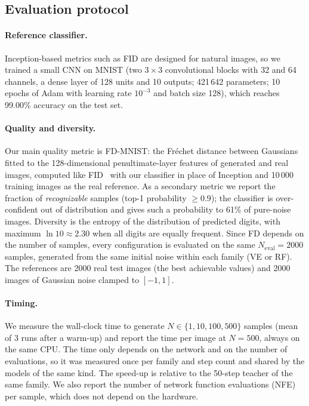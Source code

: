 \documentclass{article}
\begin{document}
\subsection{Evaluation protocol}
\label{sec:evaluation}

\paragraph{Reference classifier.} Inception-based metrics such as FID are
designed for natural images, so we trained a small CNN on MNIST (two
$3\times3$ convolutional blocks with 32 and 64 channels, a dense layer of 128
units and 10 outputs; 421\,642 parameters; 10 epochs of Adam with learning rate
$10^{-3}$ and batch size 128), which reaches 99.00\% accuracy on the test set.

\paragraph{Quality and diversity.} Our main quality metric is FD-MNIST: the
Fréchet distance between Gaussians fitted to the 128-dimensional
penultimate-layer features of generated and real images, computed like
FID~\cite{heusel2017fid} with our classifier in place of Inception and 10\,000
training images as the real reference. As a secondary metric we report the
fraction of \emph{recognizable} samples (top-1 probability $\geq 0.9$); the
classifier is over-confident out of distribution and gives such a probability
to 61\% of pure-noise images. Diversity is the entropy of the distribution of
predicted digits, with maximum $\ln 10 \approx 2.30$ when all digits are
equally frequent. Since FD depends on the number of samples, every
configuration is evaluated on the same $N_\text{eval} = 2000$ samples,
generated from the same initial noise within each family (VE or RF). The
references are 2000 real test images (the best achievable values) and 2000
images of Gaussian noise clamped to $[-1, 1]$.

\paragraph{Timing.} We measure the wall-clock time to generate
$N \in \{1, 10, 100, 500\}$ samples (mean of 3 runs after a warm-up) and
report the time per image at $N = 500$, always on the same CPU. The time only
depends on the network and on the number of evaluations, so it was measured once
per family and step count and shared by the models of the same kind. The speed-up is
relative to the 50-step teacher of the same family. We also report the number
of network function evaluations (NFE) per sample, which does not depend on the
hardware.
\end{document}
